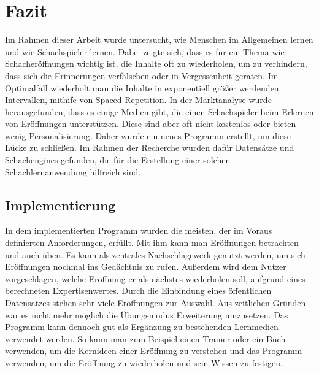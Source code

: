 
\chapter{Fazit}
Im Rahmen dieser Arbeit wurde untersucht, wie Menschen im Allgemeinen lernen und wie Schachspieler lernen. Dabei zeigte sich, dass es für ein Thema wie Schacheröffnungen wichtig ist, die Inhalte oft zu wiederholen, um zu verhindern, dass sich die Erinnerungen verfälschen oder in Vergessenheit geraten. Im Optimalfall wiederholt man die Inhalte in exponentiell größer werdenden Intervallen, mithife von Spaced Repetition. In der Marktanalyse wurde herausgefunden, dass es einige Medien gibt, die einen Schachspieler beim Erlernen von Eröffnungen unterstützen. Diese sind aber oft nicht kostenlos oder bieten wenig Personalisierung. Daher wurde ein neues Programm erstellt, um diese Lücke zu schließen. Im Rahmen der Recherche wurden dafür Datensätze und Schachengines gefunden, die für die Erstellung einer solchen Schachlernanwendung hilfreich sind.

\section{Implementierung}
In dem implementierten Programm wurden die meisten, der im Voraus definierten Anforderungen, erfüllt. Mit ihm kann man Eröffnungen betrachten und auch üben. Es kann als zentrales Nachschlagewerk genutzt werden, um sich Eröffnungen nochmal ins Gedächtnis zu rufen. Außerdem wird dem Nutzer vorgeschlagen, welche Eröffnung er als nächstes wiederholen soll, aufgrund eines berechneten Expertisenwertes. Durch die Einbindung eines öffentlichen Datensatzes stehen sehr viele Eröffnungen zur Auswahl. Aus zeitlichen Gründen war es nicht mehr möglich die Übungsmodus Erweiterung umzusetzen. Das Programm kann dennoch gut als Ergänzung zu bestehenden Lernmedien verwendet werden. So kann man zum Beispiel einen Trainer oder ein Buch verwenden, um die Kernideen einer Eröffnung zu verstehen und das Programm verwenden, um die Eröffnung zu wiederholen und sein Wissen zu festigen.

